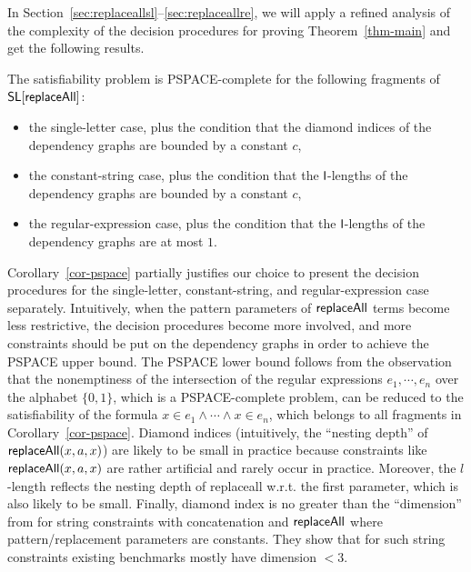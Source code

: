 In Section~\ref{sec:replaceallsl}--\ref{sec:replaceallre}, we will apply a refined analysis of the complexity of the decision procedures for proving Theorem~\ref{thm-main} and get the following results.

\begin{corollary}\label{cor-pspace}
The satisfiability problem is PSPACE-complete for the following fragments of $\mathsf{SL}[\mathsf{replaceAll}]$:
\begin{itemize}
\item the single-letter case, plus the condition that the diamond indices of the dependency graphs are bounded by a constant $c$, 
%
\item the constant-string case, plus the condition that the $\mathsf{l}$-lengths of the dependency graphs are bounded by a constant $c$, 

%
\item the regular-expression case, plus the condition that the $\mathsf{l}$-lengths of the dependency graphs are at most $1$.
\end{itemize}
\end{corollary}

Corollary~\ref{cor-pspace} partially justifies our choice to present the decision procedures for the single-letter, constant-string, and regular-expression case separately. Intuitively, when the pattern parameters of $\mathsf{replaceAll}$ terms become less restrictive, the decision procedures become more involved, and more constraints should be put on the dependency graphs in order to achieve the PSPACE upper bound. The PSPACE lower bound follows from the observation that the nonemptiness of the intersection of the regular expressions $e_1, \cdots, e_n$ over the alphabet $\{0,1\}$, which is a PSPACE-complete problem, can be reduced to the satisfiability of the formula $x \in e_1 \wedge \cdots \wedge x \in e_n$, 
%
which belongs to all fragments in Corollary~\ref{cor-pspace}.
%
Diamond indices (intuitively, the ``nesting depth'' of $\mathsf{replaceAll}(x,a,x)$) are likely to be small in practice because constraints like $\mathsf{replaceAll}(x,a,x)$ are rather artificial and rarely occur in practice. Moreover, the $l$-length reflects the nesting depth of replaceall w.r.t. the first parameter, which is also likely to be small. Finally, diamond index is no greater than the ``dimension'' from \cite{LB16} for string constraints with concatenation and $\mathsf{replaceAll}$ where pattern/replacement parameters are constants. They show that for such string constraints existing benchmarks mostly have dimension $<3$. 

